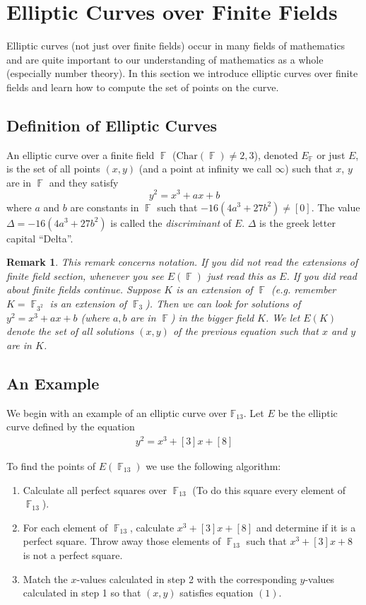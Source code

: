 \documentclass[12 pt]{article}
\newtheorem{remark}{Remark}
\DeclareMathOperator{\F}{\mathbb{F}}
\begin{document}
\newpage
\section{Elliptic Curves over Finite Fields}
Elliptic curves (not just over finite fields) occur in many fields of mathematics and are quite important to our understanding of mathematics as a whole (especially number theory). In this section we introduce elliptic curves over finite fields and learn how to compute the set of points on the curve.

\subsection{Definition of Elliptic Curves}

An elliptic curve over a finite field $\F$ ($\text{Char}(\F)\not= 2, 3$), denoted $E_{\F}$ or just $E$, is the set of all points $(x,y)$ (and a point at infinity we call $\infty$) such that $x$, $y$ are in $\F$ and they satisfy
\[
y^2=x^3+ax+b
\]
where $a$ and $b$ are constants in $\F$ such that $-16(4a^3+27b^2)\not= [0]$. The value $\Delta=-16(4a^3+27b^2)$ is called the \emph{discriminant} of $E$. $\Delta$ is the greek letter capital ``Delta''. 

\begin{remark}
This remark concerns notation. If you did \emph{not} read the extensions of finite field section, whenever you see $E(\F)$ just read this as $E$. If you did read about finite fields continue. Suppose $K$ is an extension of $\F$ (e.g. remember $K=\F_{3^2}$ is an extension of $\F_3$). Then we can look for solutions of $y^2=x^3+ax+b$ (where $a,b$ are in $\F$) in the bigger field $K$. We let $E(K)$ denote the set of all solutions $(x,y)$ of the previous equation such that $x$ and $y$ are in $K$.
\end{remark}

\subsection{An Example}

We begin with an example of an elliptic curve over $\mathbb{F}_{13}$.
Let $E$ be the elliptic curve defined by the equation
\begin{align}
y^2=x^3+[3]x+[8]
\end{align}

To find the points of $E(\F_{13})$ we use the following algorithm:
\begin{enumerate}
\item Calculate all perfect squares over $\F_{13}$ (To do this square every element of $\F_{13}$).
\item For each element of $\F_{13}$, calculate $x^3+[3]x+[8]$ and determine if it is a perfect square. Throw away those elements of $\F_{13}$ such that $x^3+[3]x+8$ is not a perfect square.
\item Match the $x$-values calculated in step 2 with the corresponding $y$-values calculated in step 1 so that $(x,y)$ satisfies equation $(1)$.
\end{enumerate}
\end{document}
